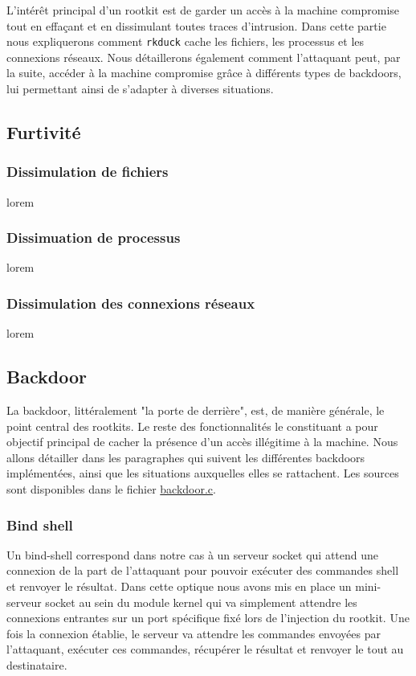 \documentclass[12pt]{article}
\begin{document}
    L'intérêt principal d'un rootkit est de garder un accès à la machine compromise tout en effaçant et en dissimulant toutes traces d'intrusion. Dans cette partie nous expliquerons comment \texttt{rkduck} cache les fichiers, les processus et les connexions réseaux. Nous détaillerons également comment l'attaquant peut, par la suite, accéder à la machine compromise grâce à différents types de backdoors, lui permettant ainsi de s'adapter à diverses situations.

    \subsection{Furtivité}
    
        \subsubsection{Dissimulation de fichiers}
            lorem
        \subsubsection{Dissimuation de processus}
            lorem
        \subsubsection{Dissimulation des connexions réseaux}
        \label{sec:ip}
            lorem

    \subsection{Backdoor}

        La backdoor, littéralement "la porte de derrière", est, de manière générale, le point central des rootkits. Le reste des fonctionnalités le constituant a pour objectif principal de cacher la présence d'un accès illégitime à la machine. Nous allons détailler dans les paragraphes qui suivent les différentes backdoors implémentées, ainsi que les situations auxquelles elles se rattachent. Les sources sont disponibles dans le fichier \href{https://github.com/QuokkaLight/rkduck/blob/master/rkduck/backdoor.c}{backdoor.c}.
    
        \subsubsection{Bind shell}
            
            Un bind-shell correspond dans notre cas à un serveur socket qui attend une connexion de la part de l'attaquant pour pouvoir exécuter des commandes shell et renvoyer le résultat. Dans cette optique nous avons mis en place un mini-serveur socket au sein du module kernel qui va simplement attendre les connexions entrantes sur un port spécifique fixé lors de l'injection du rootkit. Une fois la connexion établie, le serveur va attendre les commandes envoyées par l'attaquant, exécuter ces commandes, récupérer le résultat et renvoyer le tout au destinataire. 
            
\end{document}
